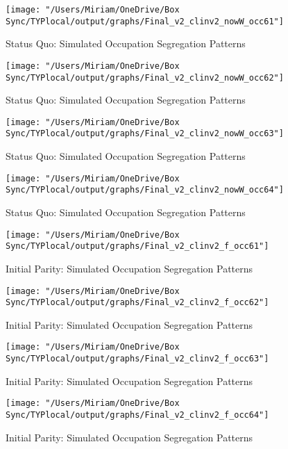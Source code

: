 \documentclass[11pt]{article}
\begin{document}
\begin{center}
\begin{figure}[H]
\centering
\caption{Status Quo: Simulated Occupation Segregation Patterns}
\label{fig:sq1}
\texttt{[image: "/Users/Miriam/OneDrive/Box Sync/TYPlocal/output/graphs/Final\_v2\_clinv2\_nowW\_occ61"]}
\end{figure}
\begin{figure}[H]
\centering
\caption{Status Quo: Simulated Occupation Segregation Patterns}
\label{fig:sq2}
\texttt{[image: "/Users/Miriam/OneDrive/Box Sync/TYPlocal/output/graphs/Final\_v2\_clinv2\_nowW\_occ62"]}
\end{figure}
\begin{figure}[H]
\centering
\caption{Status Quo: Simulated Occupation Segregation Patterns}
\label{fig:sq3}
\texttt{[image: "/Users/Miriam/OneDrive/Box Sync/TYPlocal/output/graphs/Final\_v2\_clinv2\_nowW\_occ63"]}
\end{figure}
\begin{figure}[H]
\centering
\caption{Status Quo: Simulated Occupation Segregation Patterns}
\label{fig:sq4}
\texttt{[image: "/Users/Miriam/OneDrive/Box Sync/TYPlocal/output/graphs/Final\_v2\_clinv2\_nowW\_occ64"]}
\end{figure}
\end{center}

\begin{center}
\begin{figure}[H]
\centering
\caption{Initial Parity: Simulated Occupation Segregation Patterns}
\label{fig:ip1}
\texttt{[image: "/Users/Miriam/OneDrive/Box Sync/TYPlocal/output/graphs/Final\_v2\_clinv2\_f\_occ61"]}
\end{figure}
\begin{figure}[H]
\centering
\caption{Initial Parity: Simulated Occupation Segregation Patterns}
\label{fig:ip2}
\texttt{[image: "/Users/Miriam/OneDrive/Box Sync/TYPlocal/output/graphs/Final\_v2\_clinv2\_f\_occ62"]}
\end{figure}
\begin{figure}[H]
\centering
\caption{Initial Parity: Simulated Occupation Segregation Patterns}
\label{fig:ip3}
\texttt{[image: "/Users/Miriam/OneDrive/Box Sync/TYPlocal/output/graphs/Final\_v2\_clinv2\_f\_occ63"]}
\end{figure}
\begin{figure}[H]
\centering
\caption{Initial Parity: Simulated Occupation Segregation Patterns}
\label{fig:ip4}
\texttt{[image: "/Users/Miriam/OneDrive/Box Sync/TYPlocal/output/graphs/Final\_v2\_clinv2\_f\_occ64"]}
\end{figure}
\end{center}
\end{document}
